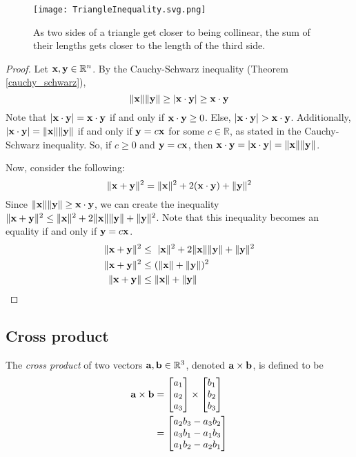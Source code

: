 \documentclass[../main.tex]{subfiles}
\begin{document}
\begin{figure}[H]
	\centering
	\texttt{[image: TriangleInequality.svg.png]}
	\caption{As two sides of a triangle get closer to being collinear,
		the sum of their lengths gets closer to the length of the third side.}
\end{figure}

\begin{proof}
	Let $\mathbf{x}, \mathbf{y} \in \mathbb{R}^n$.
	By the Cauchy-Schwarz inequality (Theorem \ref{cauchy_schwarz}),
	$$\|\mathbf{x}\|\|\mathbf{y}\|\geq |\mathbf{x}\cdot\mathbf{y}|\geq\mathbf{x}\cdot\mathbf{y}$$
	Note that $|\mathbf{x}\cdot\mathbf{y}|=\mathbf{x}\cdot\mathbf{y}$ if and only if
	$\mathbf{x}\cdot\mathbf{y}\geq0$. Else, $|\vect{x}\cdot\vect{y}|>\vect{x}\cdot\vect{y}$.
	Additionally, $|\mathbf{x}\cdot\mathbf{y}|=\|\mathbf{x}\|\|\mathbf{y}\|$ if and only if
	$\mathbf{y}=c\mathbf{x}$ for some $c \in \mathbb{R}$, as stated in the Cauchy-Schwarz inequality.
	So, if $c\geq0$ and $\mathbf{y}=c\mathbf{x}$, then
	$\mathbf{x}\cdot\mathbf{y}=|\mathbf{x}\cdot\mathbf{y}|=\|\mathbf{x}\|\|\mathbf{y}\|$.

	Now, consider the following:
	$$\|\mathbf{x} + \mathbf{y}\|^2  = \|\mathbf{x}\|^2+2(\mathbf{x}\cdot\mathbf{y})+\|\mathbf{y}\|^2 $$
	Since $\|\mathbf{x}\|\|\mathbf{y}\|\geq\mathbf{x}\cdot\mathbf{y}$,
	we can create the inequality $\|\mathbf{x}+\mathbf{y}\|^2\leq\|\mathbf{x}\|^2+2\|\mathbf{x}\|\|\mathbf{y}\|+\|\mathbf{y}\|^2$.
	Note that this inequality becomes an equality if and only if $\mathbf{y}=c\mathbf{x}$.
	\begin{align*}
		\|\vect{x}+\vect{y}\|^2   & \leq\ |\vect{x}\|^2+2\|\vect{x}\|\|\vect{y}\|+\|\vect{y}\|^2 \\
		\|\vect{x} + \vect{y}\|^2 & \leq (\|\vect{x}\|+\|\vect{y}\|)^2                           \\
		\|\vect{x} + \vect{y}\|   & \leq \|\vect{x}\|+\|\vect{y}\|
	\end{align*}
\end{proof}

\subsection{Cross product}

\begin{definition}
	The \textit{cross product} of two vectors $\mathbf{a}, \mathbf{b} \in \mathbb{R}^3$,
	denoted $\mathbf{a}\times\mathbf{b}$, is defined to be
	\begin{align*}
		\mathbf{a}\times\mathbf{b} & = \begin{bmatrix}a_1\\a_2\\a_3\end{bmatrix}\times\begin{bmatrix}b_1\\b_2\\b_3\end{bmatrix} \\
		                       & = \begin{bmatrix}a_2b_3-a_3b_2\\a_3b_1-a_1b_3\\a_1b_2-a_2b_1\end{bmatrix}
	\end{align*}
\end{definition}
\end{document}
